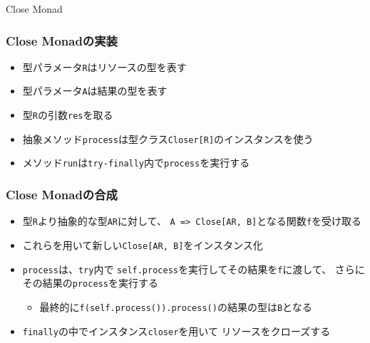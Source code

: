 \begin{frame}
  \centering
  {\Huge Close Monad}
\end{frame}

\begin{frame}
  
\end{frame}

\begin{frame}
  \frametitle{Close Monadの実装}

  

  \begin{itemize}
    \item<2-> 型パラメータ\lstinline|R|はリソースの型を表す
    \item<3-> 型パラメータ\lstinline|A|は結果の型を表す
    \item<4-> 型\lstinline|R|の引数\lstinline|res|を取る
    \item<5-> 抽象メソッド\lstinline|process|は型クラス\lstinline|Closer[R]|のインスタンスを使う
    \item<6-> メソッド\lstinline|run|は\lstinline|try-finally|内で\lstinline|process|を実行する
  \end{itemize}
\end{frame}

\begin{frame}
  \frametitle{Close Monadの合成}

  

  \begin{itemize}
    \item<2-> 型\lstinline|R|より抽象的な型\lstinline|AR|に対して、
    \lstinline|A => Close[AR, B]|となる関数\lstinline|f|を受け取る
    \item<3-> これらを用いて新しい\lstinline|Close[AR, B]|をインスタンス化
    \item<4-> \lstinline|process|は、\lstinline|try|内で
    \lstinline|self.process|を実行してその結果を\lstinline|f|に渡して、
    さらにその結果の\lstinline|process|を実行する
    \begin{itemize}
      \item<5-> 最終的に\lstinline|f(self.process()).process()|の結果の型は\lstinline|B|となる
    \end{itemize}
    \item<6-> \lstinline|finally|の中でインスタンス\lstinline|closer|を用いて
    リソースをクローズする
  \end{itemize}
\end{frame}

